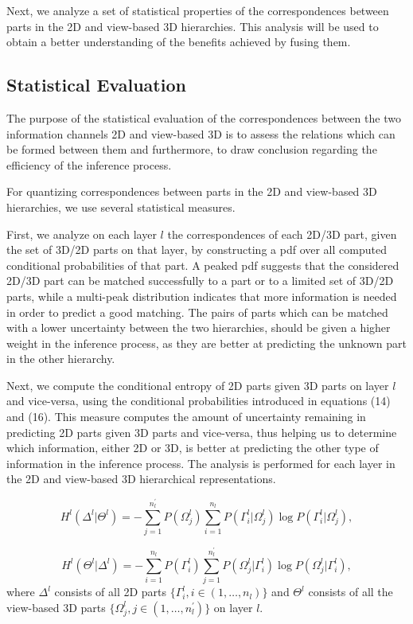 \documentclass[runningheads]{llncs}
\begin{document}
Next, we analyze a set of statistical properties of the correspondences between parts in the 2D and view-based 3D hierarchies. This analysis will be used to obtain a better understanding of the benefits achieved by fusing them.

\subsection{Statistical Evaluation}
\label{sec:statistical}

The purpose of the statistical evaluation of the correspondences between the two information channels 2D and view-based 3D is to assess the relations which can be formed between them and furthermore, to draw conclusion regarding the efficiency of the inference process. 

For quantizing correspondences between parts in the 2D and view-based 3D hierarchies, we use several statistical measures.

First, we analyze on each layer $l$ the correspondences of each 2D/3D part, given the set of 3D/2D parts on that layer, by constructing a pdf over all computed conditional probabilities of that part. A peaked pdf suggests that the considered 2D/3D part can be matched successfully to a part or to a limited set of 3D/2D parts, while a multi-peak distribution indicates that more information is needed in order to predict a good matching. The pairs of parts which can be matched with a lower uncertainty between the two hierarchies, should be given a higher weight in the inference process, as they are better at predicting the unknown part in the other hierarchy.

Next, we compute the conditional entropy of 2D parts given 3D parts on layer $l$ and vice-versa, using the conditional probabilities introduced in equations (14) and (16). This measure computes the amount of uncertainty remaining in predicting 2D parts given 3D parts and vice-versa, thus helping us to determine which information, either 2D or 3D, is better at predicting the other type of information in the inference process. The analysis is performed for each layer in the 2D and view-based 3D hierarchical representations.

\begin{equation}
 H^l(\Delta^l|\Theta^l) = -\sum\limits_{j=1}^{n_l^{'}}P({\Omega_j^l})\sum\limits_{i=1}^{n_l}P(\Gamma_i^l|\Omega_j^l)\log P(\Gamma_i^l|\Omega_j^l), 
\end{equation}

\begin{equation}
 H^l(\Theta^l|\Delta^l) = -\sum\limits_{i=1}^{n_l}P({\Gamma_i^l})\sum\limits_{j=1}^{n_l^{'}}P(\Omega_j^l|\Gamma_i^l)\log P(\Omega_j^l|\Gamma_i^l),
\end{equation}
where $\Delta^l$ consists of all 2D parts $\{\Gamma_i^l, i \in (1,\ldots,n_l)\}$ and $\Theta^l$ consists of all the view-based 3D parts $\{\Omega_j^l, j \in (1,\ldots,n_l^{'})\}$ on layer $l$.
\end{document}
